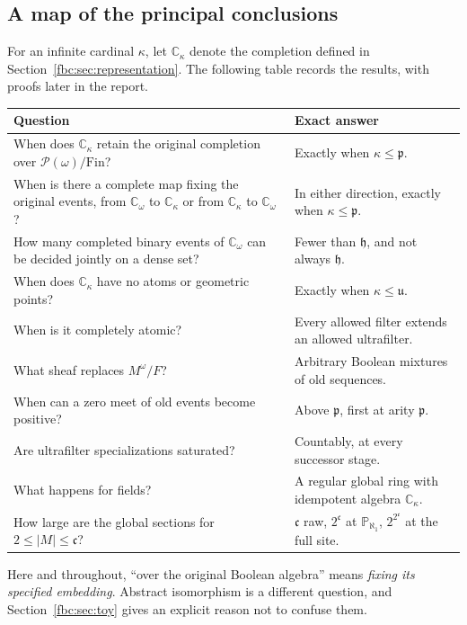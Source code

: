 \documentclass[11pt,letterpaper]{article}
\theoremstyle{definition}
\theoremstyle{remark}
\newcommand{\om}{\omega}
\newcommand{\Fin}{\mathrm{Fin}}
\newcommand{\C}{\mathbb C}
\newcommand{\PP}{\mathbb P}
\newcommand{\pow}{\mathcal P}
\newcommand{\cp}{\mathfrak p}
\newcommand{\cu}{\mathfrak u}
\newcommand{\cc}{\mathfrak c}
\newcommand{\ch}{\mathfrak h}
\begin{document}
\subsection{A map of the principal conclusions}
For an infinite cardinal $\kappa$, let $\C_\kappa$ denote the completion
defined in Section~\ref{fbc:sec:representation}. The following table
records the results, with proofs later in the report.
\begin{center}
\small
\begin{tabular}{p{}p{}}
\toprule
Question & Exact answer\\
\midrule
When does $\C_\kappa$ retain the original completion over
$\pow(\om)/\Fin$? & Exactly when $\kappa\leq\cp$.\\[2pt]
When is there a complete map fixing the original events, from
$\C_\om$ to $\C_\kappa$ or from $\C_\kappa$ to $\C_\om$?
& In either direction, exactly when $\kappa\leq\cp$.\\[2pt]
How many completed binary events of $\C_\om$ can be decided jointly on
a dense set? & Fewer than $\ch$, and not always $\ch$.\\[2pt]
When does $\C_\kappa$ have no atoms or geometric points?
& Exactly when $\kappa\leq\cu$.\\[2pt]
When is it completely atomic?
& Every allowed filter extends an allowed ultrafilter.\\[2pt]
What sheaf replaces $M^\om/F$?
& Arbitrary Boolean mixtures of old sequences.\\[2pt]
When can a zero meet of old events become positive?
& Above $\cp$, first at arity $\cp$.\\[2pt]
Are ultrafilter specializations saturated?
& Countably, at every successor stage.\\[2pt]
What happens for fields?
& A regular global ring with idempotent algebra $\C_\kappa$.\\[2pt]
How large are the global sections for $2\leq|M|\leq\cc$?
& $\cc$ raw, $2^\cc$ at $\PP_{\aleph_1}$, $2^{2^\cc}$ at the full site.\\
\bottomrule
\end{tabular}
\end{center}
Here and throughout, ``over the original Boolean algebra'' means
\emph{fixing its specified embedding}. Abstract isomorphism is a
different question, and Section~\ref{fbc:sec:toy} gives an explicit
reason not to confuse them.
\end{document}
